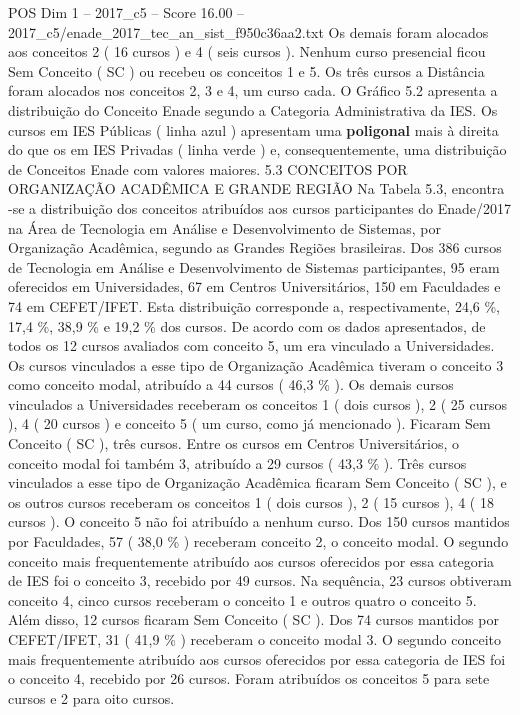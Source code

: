 \begin{textsample}{POS Dim 1 – 2017\_c5 – Score 16.00 – 2017\_c5/enade\_2017\_tec\_an\_sist\_f950c36aa2.txt}
Os demais foram alocados aos conceitos 2 ( 16 cursos ) e 4 ( seis cursos ).
Nenhum curso presencial ficou Sem Conceito ( SC ) ou recebeu os conceitos 1 e 5.
Os três cursos a Distância foram alocados nos conceitos 2, 3 e 4, um curso cada.
O Gráfico 5.2 apresenta a distribuição do Conceito Enade segundo a Categoria Administrativa da IES.
Os cursos em IES Públicas ( linha azul ) apresentam uma \textbf{poligonal} mais à direita do que os em IES Privadas ( linha verde ) e, consequentemente, uma distribuição de Conceitos Enade com valores maiores. 5.3 CONCEITOS POR ORGANIZAÇÃO ACADÊMICA E GRANDE REGIÃO Na Tabela 5.3, encontra -se a distribuição dos conceitos atribuídos aos cursos participantes do Enade/2017 na Área de Tecnologia em Análise e Desenvolvimento de Sistemas, por Organização Acadêmica, segundo as Grandes Regiões brasileiras.
Dos 386 cursos de Tecnologia em Análise e Desenvolvimento de Sistemas participantes, 95 eram oferecidos em Universidades, 67 em Centros Universitários, 150 em Faculdades e 74 em CEFET/IFET.
Esta distribuição corresponde a, respectivamente, 24,6 \%, 17,4 \%, 38,9 \% e 19,2 \% dos cursos.
De acordo com os dados apresentados, de todos os 12 cursos avaliados com conceito 5, um era vinculado a Universidades.
Os cursos vinculados a esse tipo de Organização Acadêmica tiveram o conceito 3 como conceito modal, atribuído a 44 cursos ( 46,3 \% ).
Os demais cursos vinculados a Universidades receberam os conceitos 1 ( dois cursos ), 2 ( 25 cursos ), 4 ( 20 cursos ) e conceito 5 ( um curso, como já mencionado ).
Ficaram Sem Conceito ( SC ), três cursos.
Entre os cursos em Centros Universitários, o conceito modal foi também 3, atribuído a 29 cursos ( 43,3 \% ).
Três cursos vinculados a esse tipo de Organização Acadêmica ficaram Sem Conceito ( SC ), e os outros cursos receberam os conceitos 1 ( dois cursos ), 2 ( 15 cursos ), 4 ( 18 cursos ).
O conceito 5 não foi atribuído a nenhum curso.
Dos 150 cursos mantidos por Faculdades, 57 ( 38,0 \% ) receberam conceito 2, o conceito modal.
O segundo conceito mais frequentemente atribuído aos cursos oferecidos por essa categoria de IES foi o conceito 3, recebido por 49 cursos.
Na sequência, 23 cursos obtiveram conceito 4, cinco cursos receberam o conceito 1 e outros quatro o conceito 5.
Além disso, 12 cursos ficaram Sem Conceito ( SC ).
Dos 74 cursos mantidos por CEFET/IFET, 31 ( 41,9 \% ) receberam o conceito modal 3.
O segundo conceito mais frequentemente atribuído aos cursos oferecidos por essa categoria de IES foi o conceito 4, recebido por 26 cursos.
Foram atribuídos os conceitos 5 para sete cursos e 2 para oito cursos.

\end{textsample}

